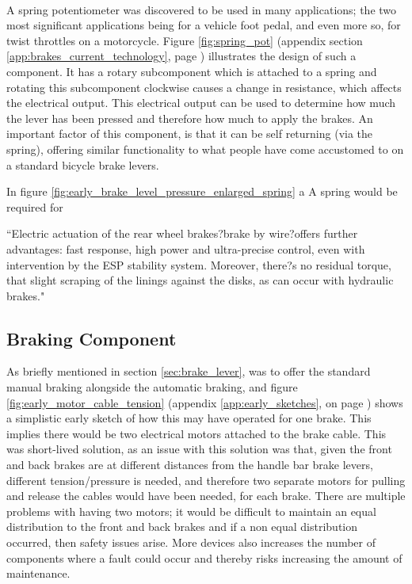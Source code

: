 \documentclass[a4paper]{report}
\begin{document}
\paragraph{}
A spring potentiometer was discovered to be used in many applications; the two most significant applications being for a vehicle foot pedal, and even more so, for twist throttles on a motorcycle. Figure \ref{fig:spring_pot} (appendix section \ref{app:brakes_current_technology}, page \pageref{fig:spring_pot}) illustrates the design of such a component. It has a rotary subcomponent which is attached to a spring and rotating this subcomponent clockwise causes a change in resistance, which affects the electrical output. This electrical output can be used to determine how much the lever has been pressed and therefore how much to apply the brakes. An important factor of this component, is that it can be self returning (via the spring), offering similar functionality to what people have come accustomed to on a standard bicycle brake levers.

In figure \ref{fig:early_brake_level_pressure_enlarged_spring} a A spring would be required for 

``Electric actuation of the rear wheel brakes?brake by wire?offers further advantages: fast response, high power and ultra-precise control, even with intervention by the ESP stability system. Moreover, there?s no residual torque, that slight scraping of the linings against the disks, as can occur with hydraulic brakes."


\subsection{Braking Component}
\label{sec:braking_component}

As briefly mentioned in section \ref{sec:brake_lever}, was to offer the standard manual braking alongside the automatic braking, and figure \ref{fig:early_motor_cable_tension} (appendix \ref{app:early_sketches}, on page \pageref{fig:early_motor_cable_tension}) shows a simplistic early sketch of how this may have operated for one brake. This implies there would be two electrical motors attached to the brake cable. This was short-lived solution, as an issue with this solution was that, given the front and back brakes are at different distances from the handle bar brake levers, different tension/pressure is needed, and therefore two separate motors for pulling and release the cables would have been needed, for each brake. There are multiple problems with having two motors; it would be difficult to maintain an equal distribution to the front and back brakes and if a non equal distribution occurred, then safety issues arise. More devices also increases the number of components where a fault could occur and thereby risks increasing the amount of maintenance.  
\end{document}
